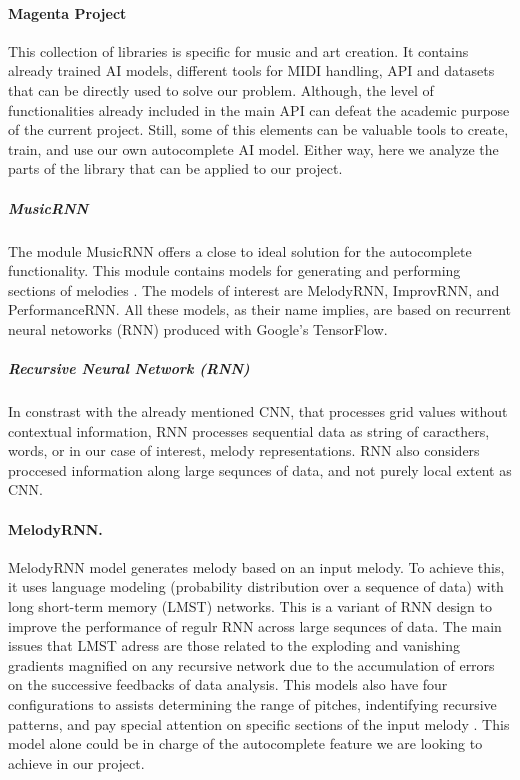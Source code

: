 \paragraph{Magenta Project} This collection of libraries is specific for music and art 
creation. It contains already trained AI models, different tools for MIDI handling, API 
and datasets that can be directly used to solve our problem. Although, the level of
functionalities already included in the main API can defeat the academic purpose of the
current project. Still, some of this elements can be valuable tools to create, train, and
use our own autocomplete AI model. Either way, here we analyze the parts of the library that
can be applied to our project.

\subparagraph{MusicRNN} The module MusicRNN offers a close to ideal solution for the
autocomplete functionality. This module contains models for generating and performing
sections of melodies \autocite{musicRNN}. The models of interest are MelodyRNN, ImprovRNN,
and PerformanceRNN. All these models, as their name implies, are based on recurrent neural
netoworks (RNN) produced with Google's TensorFlow.

\subparagraph{Recursive Neural Network (RNN)} In constrast with the already mentioned CNN,
that processes grid values without contextual information, RNN processes sequential data
as string of caracthers, words, or in our case of interest, melody representations. RNN
also considers proccesed information along large sequnces of data, and not purely local
extent as CNN.\autocite{fundamentalML}

\paragraph{MelodyRNN.}
MelodyRNN model generates melody based on an input melody. To achieve this, it uses
language modeling (probability distribution over a sequence of data) with long short-term
memory (LMST) networks. This is a variant of RNN design to improve the performance of
regulr RNN across large sequnces of data. The main issues that LMST adress are those
related to the exploding and vanishing gradients magnified on any recursive network due to
the accumulation of errors on the successive feedbacks of data analysis. This models also
have four configurations to assists determining the range of pitches, indentifying
recursive patterns, and pay special attention on specific sections of the input melody
\autocite{melodyRNN}. This model alone could be in charge of the autocomplete feature we
are looking to achieve in our project.

